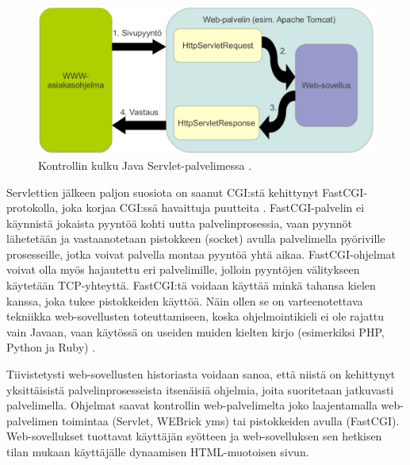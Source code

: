 \begin{figure}[ht]
\centering
\includegraphics[width=\textwidth]{web/servlet.eps}
\caption{Kontrollin kulku Java Servlet-palvelimessa \cite{j2ee}.}%
\label{servlet}
\end{figure}

Servlettien jälkeen paljon suosiota on saanut CGI:stä kehittynyt FastCGI-protokolla, joka korjaa CGI:ssä havaittuja puutteita \cite{fastcgi}. FastCGI-palvelin ei käynnistä jokaista pyyntöä kohti uutta palvelinprosessia, vaan pyynnöt lähetetään ja vas\-taan\-o\-te\-taan pistokkeen (socket) avulla palvelimella pyöriville prosesseille, jotka voivat palvella montaa pyyntöä yhtä aikaa. FastCGI-ohjelmat voivat olla myös hajautettu eri palvelimille, jolloin pyyntöjen välitykseen käytetään TCP-yhteyttä. FastCGI:tä voidaan käyttää minkä tahansa kielen kanssa, joka tukee pistokkeiden käyttöä. Näin ollen se on varteenotettava tekniikka web-sovellusten toteuttamiseen, koska ohjelmointikieli ei ole rajattu vain Javaan, vaan käytössä on useiden muiden kielten kirjo (esimerkiksi PHP, Python ja Ruby) \cite{fastcgi}.

Tiivistetysti web-sovellusten historiasta voidaan sanoa, että niistä on kehittynyt yksittäisistä palvelinprosesseista itsenäisiä ohjelmia, joita suoritetaan jatkuvasti palvelimella. Ohjelmat saavat kontrollin web-palvelimelta joko laajentamalla web-pal\-ve\-li\-men toimintaa (Servlet, WEBrick yms) tai pistokkeiden avulla (FastCGI). Web-so\-vel\-luk\-set tuottavat käyttäjän syötteen ja web-sovelluksen sen hetkisen tilan mukaan käyttäjälle dynaamisen HTML-muotoisen sivun.